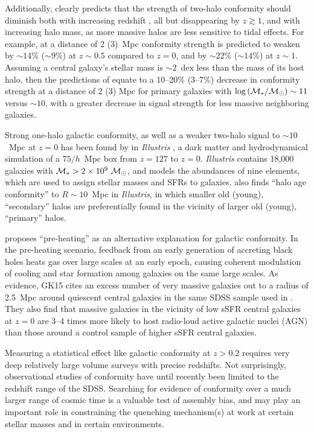 Additionally, \citet{Hearin15b} clearly predicts that the strength of two-halo conformity should diminish both with increasing redshift , all but disappearing by $z\gtrsim1$, and with increasing halo mass, as more massive halos are less sensitive to tidal effects.
For example, at a distance of 2 (3)~Mpc conformity strength is predicted to weaken by $\sim14$\% ($\sim9$\%) at $z\sim0.5$ compared to $z=0$, and by $\sim22$\% ($\sim14$\%) at $z\sim1$.
Assuming a central galaxy's stellar mass is $\sim2$~dex less than the mass of its host halo, then the predictions of \citet{Hearin15b} equate to a 10--20\% (3--7\%) decrease in conformity strength at a distance of 2 (3) Mpc for primary galaxies with $\logM\sim11$ versus $\sim10$, with a greater decrease in signal strength for less massive neighboring galaxies.

Strong one-halo galactic conformity, as well as a weaker two-halo signal to $\sim10$~Mpc at $z=0$ has been found by \citet{Bray16a} in \emph{Illustris} \citep{Vogelsberger14}, a dark matter and hydrodynamical simulation of a $75/h$~Mpc box from $z=127$ to $z=0$.
\emph{Illustris} contains 18,000 galaxies with $\mstar>2\times10^9~\msun$, and models the abundances of nine elements, which are used to assign stellar masses and SFRs to galaxies.
\citet{Bray16a} also finds ``halo age conformity'' to $R\sim10$~Mpc in \emph{Illustris}, in which smaller old (young), ``secondary'' halos are preferentially found in the vicinity of larger old (young), ``primary'' halos.

\citet[][hereafter GK15]{Kauffmann15} proposes ``pre-heating''  as an alternative explanation for galactic conformity.
In the pre-heating scenario, feedback from an early generation of accreting black holes heats gas over large scales at an early epoch, causing coherent modulation of cooling and star formation among galaxies on the same large scales.
As evidence, GK15 cites an excess number of very massive galaxies out to a radius of 2.5~Mpc around quiescent central galaxies in the same SDSS sample used in \citet{Kauffmann13}.
They also find that massive galaxies in the vicinity of low sSFR central galaxies at $z=0$ are 3--4 times more likely to host radio-loud active galactic nuclei (AGN) than those around a control sample of higher sSFR central galaxies.


Measuring a statistical effect like galactic conformity at $z>0.2$ requires very deep relatively large volume surveys with precise redshifts.
Not surprisingly, observational studies of conformity have until recently been limited to the redshift range of the SDSS.
Searching for evidence of conformity over a much larger range of cosmic time is a valuable test of assembly bias, and may play an important role in constraining the quenching mechanism(s) at work at certain stellar masses and in certain environments.

